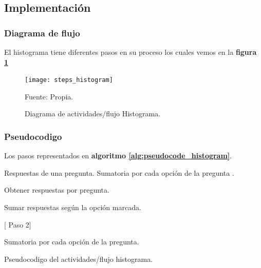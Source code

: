\subsection{Implementación}

\subsubsection{Diagrama de flujo}

El histograma tiene diferentes pasos en su proceso los cuales vemos en la \textbf{ figura \ref{fig:steps_histogram}}

\begin{figure}[H]
	\begin{center}
		\texttt{[image: steps\_histogram]}
	\end{center}
	\begin{center}
		\vskip -0.5cm
		\caption{\label{fig:steps_histogram}\small{Diagrama de actividades/flujo Histograma. }}
		{\small{Fuente: Propia.}}
	\end{center}
\end{figure}


\subsubsection{Pseudocodigo}
Los pasos representados en \textbf{ algoritmo \ref{alg:pseudocode_histogram}}.

\begin{algorithm}[H]
	\begin{algorithmic}[2]
		\REQUIRE Respuestas de una pregunta.  %
		\ENSURE Sumatoria por cada opción de la pregunta .                                                       %
		
		\STATE Obtener respuestas por pregunta.
		
		\STATE Sumar respuestas según la opción marcada. 
		
	
		 [ Paso 2]
		\ENDIF
		
		\RETURN  Sumatoria por cada opción de la pregunta.
		
		\begin{center}
			\vskip -0.5cm
			\caption{\label{alg:pseudocode_histogram}\small{Pseudocodigo del actividades/flujo histograma.}}
		\end{center}
		
	\end{algorithmic}
\end{algorithm}


